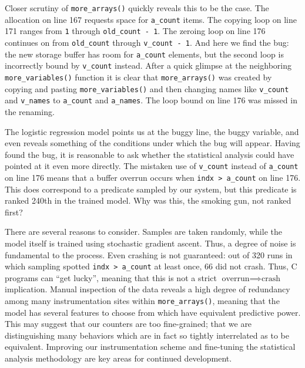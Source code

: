 Closer scrutiny of \texttt{more\_arrays()} quickly reveals this to be
the case.  The allocation on line 167 requests space for
\texttt{a\_count} items.  The copying loop on line 171 ranges from
\texttt{1} through \texttt{old\_count - 1}.  The zeroing loop on line
176 continues on from \texttt{old\_count} through \texttt{v\_count -
  1}.  And here we find the bug: the new storage buffer has room for
\texttt{a\_count} elements, but the second loop is incorrectly bound
by \texttt{v\_count} instead.  After a quick glimpse at the
neighboring \texttt{more\_variables()} function it is clear that
\texttt{more\_arrays()} was created by copying and pasting
\texttt{more\_variables()} and then changing names like
\texttt{v\_count} and \texttt{v\_names} to \texttt{a\_count} and
\texttt{a\_names}.  The loop bound on line 176 was missed in the
renaming.

The logistic regression model points us at the buggy line, the buggy
variable, and even reveals something of the conditions under which the
bug will appear.  Having found the bug, it is reasonable to ask
whether the statistical analysis could have pointed at it even more
directly.  The mistaken use of \texttt{v\_count} instead of
\texttt{a\_count} on line 176 means that a buffer overrun occurs when
\texttt{indx > a\_count} on line 176.  This does correspond to a
predicate sampled by our system, but this predicate is ranked 240th in
the trained model.  Why was this, the smoking gun, not ranked first?

There are several reasons to consider.  Samples are taken randomly,
while the model itself is trained using stochastic gradient ascent.
Thus, a degree of noise is fundamental to the process.  Even crashing
is not guaranteed: out of 320 runs in which sampling spotted
\texttt{indx > a\_count} at least once, 66 did not crash.  Thus, C
programs can ``get lucky'', meaning that this is not a strict
$\text{overrun} \implies \text{crash}$ implication.  Manual inspection
of the data reveals a high degree of redundancy among many
instrumentation sites within \texttt{more\_arrays()}, meaning that the
model has several features to choose from which have equivalent
predictive power.  This may suggest that our counters are too
fine-grained; that we are distinguishing many behaviors which are in
fact so tightly interrelated as to be equivalent.  Improving our
instrumentation scheme and fine-tuning the statistical analysis
methodology are key areas for continued development.

